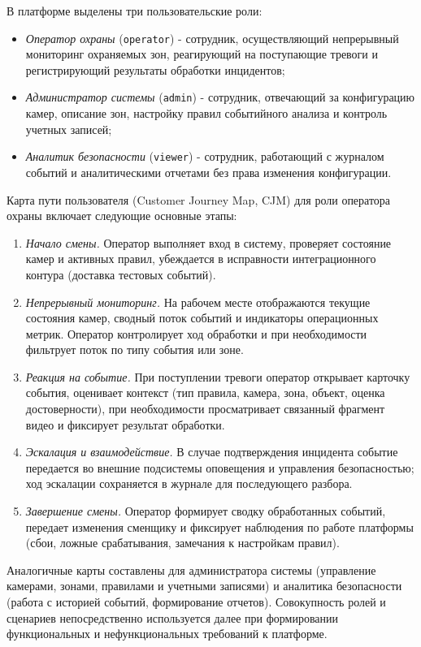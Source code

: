 В платформе выделены три пользовательские роли:
\begin{itemize}
    \item \textit{Оператор охраны} (\texttt{operator}) - сотрудник, осуществляющий непрерывный мониторинг охраняемых зон, реагирующий на поступающие тревоги и регистрирующий результаты обработки инцидентов;
    \item \textit{Администратор системы} (\texttt{admin}) - сотрудник, отвечающий за конфигурацию камер, описание зон, настройку правил событийного анализа и контроль учетных записей;
    \item \textit{Аналитик безопасности} (\texttt{viewer}) - сотрудник, работающий с журналом событий и аналитическими отчетами без права изменения конфигурации.
\end{itemize}

Карта пути пользователя (Customer Journey Map, CJM) для роли оператора охраны включает следующие основные этапы:
\begin{enumerate}
    \item \textit{Начало смены.} Оператор выполняет вход в систему, проверяет состояние камер и активных правил, убеждается в исправности интеграционного контура (доставка тестовых событий).
    \item \textit{Непрерывный мониторинг.} На рабочем месте отображаются текущие состояния камер, сводный поток событий и индикаторы операционных метрик. Оператор контролирует ход обработки и при необходимости фильтрует поток по типу события или зоне.
    \item \textit{Реакция на событие.} При поступлении тревоги оператор открывает карточку события, оценивает контекст (тип правила, камера, зона, объект, оценка достоверности), при необходимости просматривает связанный фрагмент видео и фиксирует результат обработки.
    \item \textit{Эскалация и взаимодействие.} В случае подтверждения инцидента событие передается во внешние подсистемы оповещения и управления безопасностью; ход эскалации сохраняется в журнале для последующего разбора.
    \item \textit{Завершение смены.} Оператор формирует сводку обработанных событий, передает изменения сменщику и фиксирует наблюдения по работе платформы (сбои, ложные срабатывания, замечания к настройкам правил).
\end{enumerate}

Аналогичные карты составлены для администратора системы (управление камерами, зонами, правилами и учетными записями) и аналитика безопасности (работа с историей событий, формирование отчетов). Совокупность ролей и сценариев непосредственно используется далее при формировании функциональных и нефункциональных требований к платформе.

